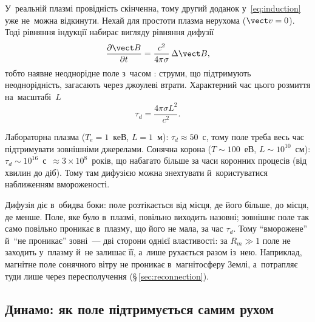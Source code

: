 У~реальній плазмі провідність скінченна, тому другий доданок у~\eqref{eq:induction} уже
не~можна відкинути. Нехай для простоти плазма нерухома ($\vect v=0$). Тоді рівняння
індукції набирає вигляду рівняння дифузії
\begin{equation*}
    \frac{\partial\vect B}{\partial t}
    =\frac{c^2}{4\pi\sigma}\,\Delta\vect B,
\end{equation*}
тобто наявне неоднорідне поле з~часом : струми, що підтримують
неоднорідність, загасають через джоулеві втрати. Характерний час цього розмиття
на~масштабі~$L$~\cite{anisimov2018}
\begin{equation*}
    \tau_d=\frac{4\pi\sigma L^2}{c^2}.
\end{equation*}
\begin{Estimate}
Лабораторна плазма ($T_e=1$~кеВ, $L=1$~м): $\tau_d\approx50$~с, тому поле треба весь час підтримувати зовнішніми
джерелами. Сонячна корона ($T\sim100$~еВ, $L\sim10^{10}$~см): $\tau_d\sim10^{16}$~с~$\approx3\times10^{8}$~років, що набагато більше за
часи коронних процесів (від хвилин до діб). Тому там дифузією можна знехтувати й~користуватися наближенням вмороженості.
\end{Estimate}

Дифузія діє в~обидва боки: поле розтікається від місця, де його більше, до місця, де менше. Поле, яке було в~плазмі, повільно виходить
назовні; зовнішнє поле так само повільно проникає в~плазму, що його не мала, за час $\tau_d$. Тому \enquote{вморожене} й~\enquote{не проникає} зовні~---
дві сторони однієї властивості: за $R_m\gg1$ поле не заходить у~плазму й~не залишає її, а~лише рухається разом із~нею. Наприклад,
магнітне поле сонячного вітру не проникає в~магнітосферу Землі, а~потрапляє туди лише через пересполучення (§\,\ref{sec:reconnection}).


\subsection*{Динамо: як поле підтримується самим рухом}\label{sec:dynamo}


